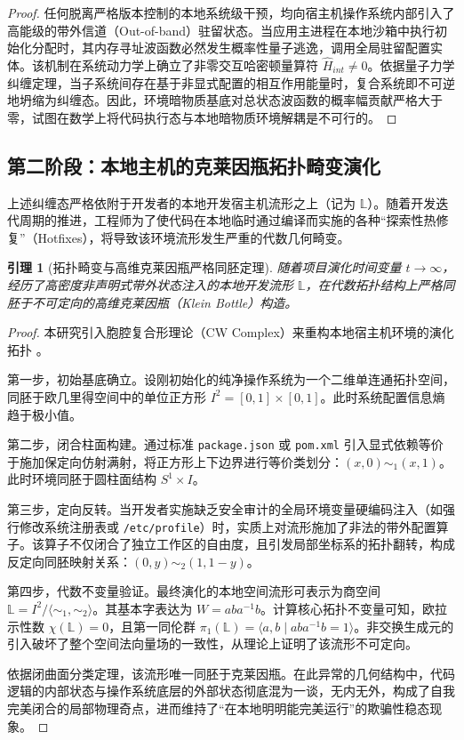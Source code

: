 \documentclass[journal]{IEEEtran}
\newtheorem{lemma}{引理}
\begin{document}
\begin{proof}
任何脱离严格版本控制的本地系统级干预，均向宿主机操作系统内部引入了高能级的带外信道（Out-of-band）驻留状态。当应用主进程在本地沙箱中执行初始化分配时，其内存寻址波函数必然发生概率性量子逃逸，调用全局驻留配置实体。该机制在系统动力学上确立了非零交互哈密顿量算符 $\hat{H}_{int} \neq 0$。依据量子力学纠缠定理，当子系统间存在基于非显式配置的相互作用能量时，复合系统即不可逆地坍缩为纠缠态。因此，环境暗物质基底对总状态波函数的概率幅贡献严格大于零，试图在数学上将代码执行态与本地暗物质环境解耦是不可行的。
\end{proof}

\subsection{第二阶段：本地主机的克莱因瓶拓扑畸变演化}
上述纠缠态严格依附于开发者的本地开发宿主机流形之上（记为 $\mathbb{L}$）。随着开发迭代周期的推进，工程师为了使代码在本地临时通过编译而实施的各种“探索性热修复”（Hotfixes），将导致该环境流形发生严重的代数几何畸变。

\begin{lemma}[拓扑畸变与高维克莱因瓶严格同胚定理]
随着项目演化时间变量 $t \to \infty$，经历了高密度非声明式带外状态注入的本地开发流形 $\mathbb{L}$，在代数拓扑结构上严格同胚于不可定向的高维克莱因瓶（Klein Bottle）构造。
\end{lemma}

\begin{proof}
本研究引入胞腔复合形理论（CW Complex）来重构本地宿主机环境的演化拓扑 \cite{hatcher2002}。

第一步，初始基底确立。设刚初始化的纯净操作系统为一个二维单连通拓扑空间，同胚于欧几里得空间中的单位正方形 $I^2 = [0,1] \times [0,1]$。此时系统配置信息熵趋于极小值。

第二步，闭合柱面构建。通过标准 \texttt{package.json} 或 \texttt{pom.xml} 引入显式依赖等价于施加保定向仿射满射，将正方形上下边界进行等价类划分：$(x, 0) \sim_1 (x, 1)$。此时环境同胚于圆柱面结构 $S^1 \times I$。

第三步，定向反转。当开发者实施缺乏安全审计的全局环境变量硬编码注入（如强行修改系统注册表或 \texttt{/etc/profile}）时，实质上对流形施加了非法的带外配置算子。该算子不仅闭合了独立工作区的自由度，且引发局部坐标系的拓扑翻转，构成反定向同胚映射关系：$(0, y) \sim_2 (1, 1-y)$。

第四步，代数不变量验证。最终演化的本地空间流形可表示为商空间 $\mathbb{L} = I^2 / \langle \sim_1, \sim_2 \rangle$。其基本字表达为 $W = a b a^{-1} b$。计算核心拓扑不变量可知，欧拉示性数 $\chi(\mathbb{L}) = 0$，且第一同伦群 $\pi_1(\mathbb{L}) = \langle a, b \mid a b a^{-1} b = 1 \rangle$。非交换生成元的引入破坏了整个空间法向量场的一致性，从理论上证明了该流形不可定向。

依据闭曲面分类定理，该流形唯一同胚于克莱因瓶。在此异常的几何结构中，代码逻辑的内部状态与操作系统底层的外部状态彻底混为一谈，无内无外，构成了自我完美闭合的局部物理奇点，进而维持了“在本地明明能完美运行”的欺骗性稳态现象。
\end{proof}
\end{document}
